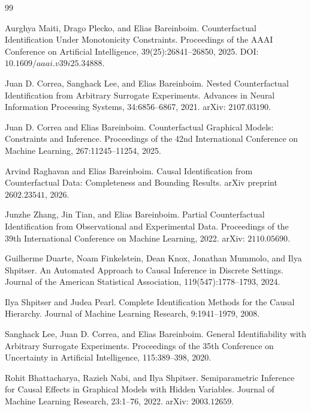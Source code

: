 \documentclass{article}
\begin{document}
\begin{thebibliography}{99}

   Aurghya Maiti, Drago Plecko, and Elias Bareinboim. Counterfactual Identification Under Monotonicity Constraints. Proceedings of the AAAI Conference on Artificial Intelligence, 39(25):26841--26850, 2025. DOI: \(10.1609/aaai.v39i25.34888\).

   Juan D. Correa, Sanghack Lee, and Elias Bareinboim. Nested Counterfactual Identification from Arbitrary Surrogate Experiments. Advances in Neural Information Processing Systems, 34:6856--6867, 2021. arXiv: \(2107.03190\).

   Juan D. Correa and Elias Bareinboim. Counterfactual Graphical Models: Constraints and Inference. Proceedings of the 42nd International Conference on Machine Learning, 267:11245--11254, 2025.

   Arvind Raghavan and Elias Bareinboim. Causal Identification from Counterfactual Data: Completeness and Bounding Results. arXiv preprint \(2602.23541\), 2026.

   Junzhe Zhang, Jin Tian, and Elias Bareinboim. Partial Counterfactual Identification from Observational and Experimental Data. Proceedings of the 39th International Conference on Machine Learning, 2022. arXiv: \(2110.05690\).

   Guilherme Duarte, Noam Finkelstein, Dean Knox, Jonathan Mummolo, and Ilya Shpitser. An Automated Approach to Causal Inference in Discrete Settings. Journal of the American Statistical Association, 119(547):1778--1793, 2024.

   Ilya Shpitser and Judea Pearl. Complete Identification Methods for the Causal Hierarchy. Journal of Machine Learning Research, 9:1941--1979, 2008.

   Sanghack Lee, Juan D. Correa, and Elias Bareinboim. General Identifiability with Arbitrary Surrogate Experiments. Proceedings of the 35th Conference on Uncertainty in Artificial Intelligence, 115:389--398, 2020.

   Rohit Bhattacharya, Razieh Nabi, and Ilya Shpitser. Semiparametric Inference for Causal Effects in Graphical Models with Hidden Variables. Journal of Machine Learning Research, 23:1--76, 2022. arXiv: \(2003.12659\).


\end{thebibliography}
\end{document}

